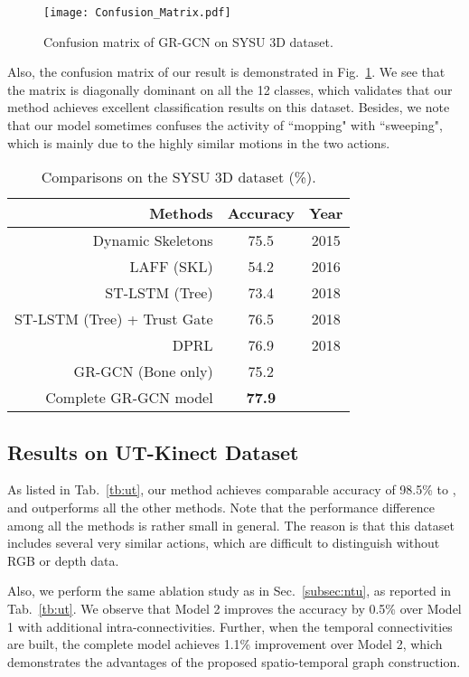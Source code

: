 \documentclass[conference]{IEEEtran}
\begin{document}
\begin{figure}[htbp]
    \centering
    \texttt{[image: Confusion\_Matrix.pdf]}
    \caption{Confusion matrix of GR-GCN on SYSU 3D dataset.}
    \label{fig:cmat}
\end{figure}

Also, the confusion matrix of our result is demonstrated in Fig.~\ref{fig:cmat}. We see that the matrix is diagonally dominant on all the 12 classes, which validates that our method achieves excellent classification results on this dataset. Besides, we note that our model sometimes confuses the activity of ``mopping" with ``sweeping", which is mainly due to the highly similar motions in the two actions.

\begin{table}
  \centering
  \caption{Comparisons on the SYSU 3D dataset (\%).}
  \label{tb:sysu}
  \begin{tabular}{rcc}
    \hline
     \textbf{Methods} & \textbf{Accuracy} & \textbf{Year} \\
    \hline
    Dynamic Skeletons \cite{Hu_2015_CVPR} & 75.5 & 2015 \\
    LAFF (SKL) \cite{hu2016real} & 54.2 & 2016 \\
    ST-LSTM (Tree) \cite{Liu_2018_TPAMI} & 73.4 & 2018 \\
    ST-LSTM (Tree) + Trust Gate \cite{Liu_2018_TPAMI} & 76.5 & 2018 \\
    DPRL \cite{Tang_2018_CVPR}  & 76.9 & 2018 \\
    \hline
    GR-GCN (Bone only) & 75.2 &  \\
    Complete GR-GCN model & \textbf{77.9} & \\
    \hline
  \end{tabular}
\end{table}

\subsection{Results on UT-Kinect Dataset}

As listed in Tab.~\ref{tb:ut}, our method achieves comparable accuracy of 98.5\% to \cite{Tang_2018_CVPR}, and outperforms all the other methods. Note that the performance difference among all the methods is rather small in general. The reason is that this dataset includes several very similar actions, which are difficult to distinguish without RGB or depth data.

Also, we perform the same ablation study as in Sec.~\ref{subsec:ntu}, as reported in Tab.~\ref{tb:ut}. We observe that Model 2 improves the accuracy by 0.5\% over Model 1 with additional intra-connectivities. Further, when the temporal connectivities are built, the complete model achieves 1.1\% improvement over Model 2, which demonstrates the advantages of the proposed spatio-temporal graph construction.   
\end{document}
